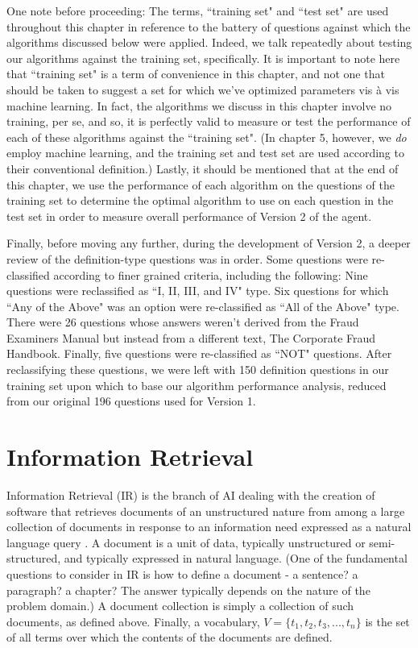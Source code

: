 One note before proceeding:  The terms, ``training set" and ``test set" are used throughout this chapter in reference to the battery of questions against which the algorithms discussed below were applied.  Indeed, we talk repeatedly about testing our algorithms against the training set, specifically. It is important to note here that ``training set" is a term of convenience in this chapter, and not one that should be taken to suggest a set for which we've optimized parameters vis \`a vis machine learning.  In fact, the algorithms we discuss in this chapter involve no training, per se, and so, it is perfectly valid to measure or test the performance of each of these algorithms against the ``training set".   (In chapter 5, however, we \emph{do} employ machine learning, and the training set and test set are used according to their conventional definition.)  Lastly, it should be mentioned that at the end of this chapter, we use the performance of each algorithm on the questions of the training set to determine the optimal algorithm to use on each question in the test set in order to measure overall performance of Version 2 of the agent.

Finally, before moving any further, during the development of Version 2, a deeper review of the definition-type questions was in order.  Some questions were re-classified according to finer grained criteria, including the following:  Nine questions were reclassified as ``I, II, III, and IV" type.  Six questions for which ``Any of the Above" was an option were re-classified as ``All of the Above" type.  There were 26 questions whose answers weren't derived from the Fraud Examiners Manual but instead from a different text, The Corporate Fraud Handbook.  Finally, five questions were re-classified as ``NOT" questions.  After reclassifying these questions, we were left with 150 definition questions in our training set upon which to base our algorithm performance analysis, reduced from our original 196 questions used for Version 1.


\section{Information Retrieval}

Information Retrieval (IR) is the branch of AI dealing with the creation of software that retrieves documents of an unstructured nature from among a large collection of documents in response to an information need expressed as a natural language query \cite{manning_2008_introduction_ch1}.   A document is a unit of data, typically unstructured or semi-structured, and typically expressed in natural language.  (One of the fundamental questions to consider in IR is how to define a document - a sentence? a paragraph? a chapter?  The answer typically depends on the nature of the problem domain.)  A document collection is simply a collection of such documents, as defined above.  Finally, a vocabulary, $V=\{t_1,t_2,t_3,...,t_n\}$ is the set of all terms over which the contents of the documents are defined.

